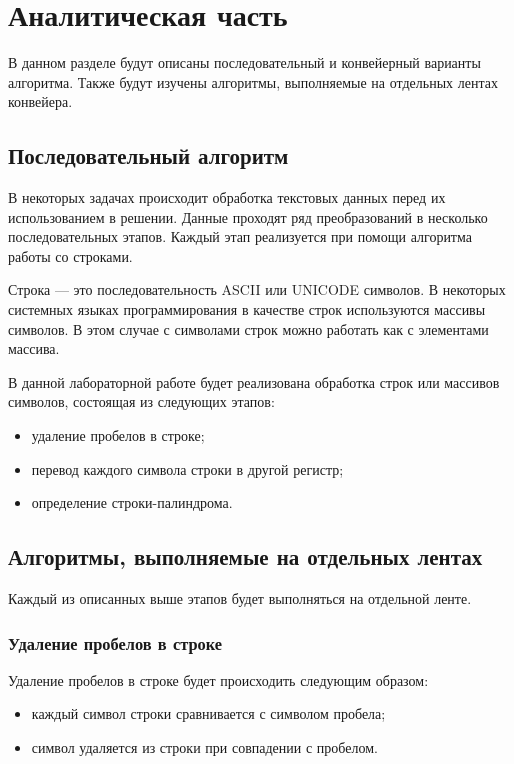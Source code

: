 \chapter{Аналитическая часть}

В данном разделе будут описаны последовательный и конвейерный варианты алгоритма. Также будут изучены алгоритмы, выполняемые на отдельных лентах конвейера.

\section{Последовательный алгоритм}

В некоторых задачах происходит обработка текстовых данных перед их использованием в решении. Данные проходят ряд преобразований в несколько последовательных этапов. Каждый этап реализуется при помощи алгоритма работы со строками.

Строка \cite{str} — это последовательность ASCII или UNICODE символов. В некоторых системных языках программирования в качестве строк используются массивы символов. В этом случае с символами строк можно работать как с элементами массива.

В данной лабораторной работе будет реализована обработка строк или массивов символов, состоящая из следующих этапов:
\begin{itemize}
	\item удаление пробелов в строке;
	\item перевод каждого символа строки в другой регистр;
	\item определение строки-палиндрома.
\end{itemize}

\section{Алгоритмы, выполняемые на отдельных лентах}

Каждый из описанных выше этапов будет выполняться на отдельной ленте.

\subsection{Удаление пробелов в строке}

Удаление пробелов в строке будет происходить следующим образом:

\begin{itemize}
	\item каждый символ строки сравнивается с символом пробела;
	\item символ удаляется из строки при совпадении с пробелом.
\end{itemize}

